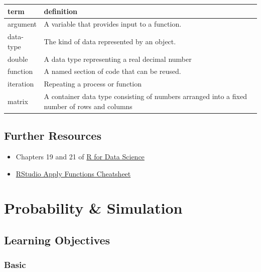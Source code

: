 \documentclass[
  oneside]{book}
\providecommand{\tightlist}{%
  \setlength{\itemsep}{0pt}\setlength{\parskip}{0pt}}
\begin{document}
\begin{tabular}{l|l}
\hline
term & definition\\
\hline
argument & A variable that provides input to a function.\\
\hline
data-type & The kind of data represented by an object.\\
\hline
double & A data type representing a real decimal number\\
\hline
function & A named section of code that can be reused.\\
\hline
iteration & Repeating a process or function\\
\hline
matrix & A container data type consisting of numbers arranged into a fixed number of rows and columns\\
\hline
\end{tabular}

\hypertarget{resources-func}{%
\section{Further Resources}\label{resources-func}}

\begin{itemize}
\tightlist
\item
  Chapters 19 and 21 of \href{http://r4ds.had.co.nz}{R for Data Science}
\item
  \href{https://github.com/rstudio/cheatsheets/raw/master/purrr.pdf}{RStudio Apply Functions Cheatsheet}
\end{itemize}

\hypertarget{sim}{%
\chapter{Probability \& Simulation}\label{sim}}

\hypertarget{ilo-sim}{%
\section{Learning Objectives}\label{ilo-sim}}

\hypertarget{basic-6}{%
\subsection*{Basic}\label{basic-6}}
\end{document}
